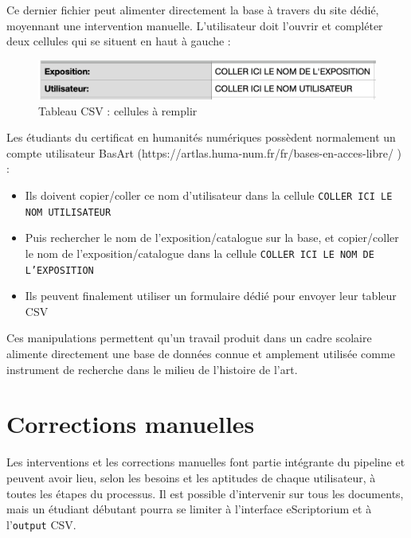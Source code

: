 \documentclass[a4paper,12pt,twoside]{book}
\begin{document}
Ce dernier fichier peut alimenter directement la base à travers du site dédié, moyennant une intervention manuelle. L'utilisateur doit l'ouvrir et compléter deux cellules qui se situent en haut à gauche :

\begin{figure}[ht]
	\centering
	\includegraphics[scale=0.6]{csv.png}		
	\caption{Tableau CSV : cellules à remplir}
\end{figure}

Les étudiants du certificat en humanités numériques possèdent normalement un compte utilisateur BasArt (https://artlas.huma-num.fr/fr/bases-en-acces-libre/ ) :
\begin{itemize}
	\item Ils doivent copier/coller ce nom d'utilisateur dans la cellule \texttt{COLLER ICI LE NOM UTILISATEUR}
	
	\item Puis rechercher le nom de l'exposition/catalogue sur la base, et copier/coller le nom de l'exposition/catalogue dans la cellule  \texttt{COLLER ICI LE NOM DE L'EXPOSITION}
	
	\item Ils peuvent finalement utiliser un formulaire dédié pour envoyer leur tableur CSV
\end{itemize}

Ces manipulations permettent qu'un travail produit dans un cadre scolaire alimente directement une base de données connue et amplement utilisée comme instrument de recherche dans le milieu de l'histoire de l'art.


\section{Corrections manuelles}

Les interventions et les corrections manuelles font partie intégrante du pipeline et peuvent avoir lieu, selon les besoins et les aptitudes de chaque utilisateur, à toutes les étapes du processus. Il est possible d'intervenir sur tous les documents, mais un étudiant débutant pourra se limiter à l'interface eScriptorium et à l'\texttt{output} CSV.
\end{document}
